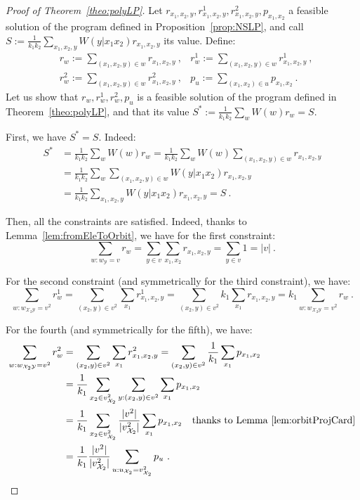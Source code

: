 \begin{proof}[Proof of Theorem~\ref{theo:polyLP}]
  Let $r_{x_1,x_2,y},r^1_{x_1,x_2,y},r^2_{x_1,x_2,y},p_{x_1,x_2}$ a feasible solution of the program defined in Proposition~\ref{prop:NSLP}, and call $S:=\frac{1}{k_1k_2} \sum_{x_1,x_2,y} W(y|x_1x_2)r_{x_1,x_2,y}$ its value. Define:
  \begin{equation}
    \begin{aligned}
      &r_w := \sum_{(x_1,x_2,y) \in w} r_{x_1,x_2,y} \ , &r^1_w := \sum_{(x_1,x_2,y) \in w} r^1_{x_1,x_2,y} \ ,\\
      &r^2_w := \sum_{(x_1,x_2,y) \in w} r^2_{x_1,x_2,y} \ , &p_u := \sum_{(x_1,x_2) \in u} p_{x_1,x_2} \ .
    \end{aligned}
  \end{equation}
  Let us show that $r_w,r^1_w,r^2_w,p_u$ is a feasible solution of the program defined in Theorem~\ref{theo:polyLP}, and that its value $S^*:=\frac{1}{k_1k_2}\sum_{w} W(w)r_w = S$.

  First, we have  $S^* = S$. Indeed:
   \begin{equation}
     \begin{aligned}
       S^*&=\frac{1}{k_1k_2}\sum_{w} W(w)r_w =\frac{1}{k_1k_2}\sum_{w} W(w) \sum_{(x_1,x_2,y) \in w} r_{x_1,x_2,y}\\
       &=\frac{1}{k_1k_2}\sum_{w} \sum_{(x_1,x_2,y) \in w} W(y|x_1x_2) r_{x_1,x_2,y}\\
       &= \frac{1}{k_1k_2}\sum_{x_1,x_2,y} W(y|x_1x_2) r_{x_1,x_2,y} = S \ .
     \end{aligned}
  \end{equation}

   Then, all the constraints are satisfied. Indeed, thanks to Lemma~\ref{lem:fromEleToOrbit}, we have for the first constraint:
   \[ \sum_{w:w_{\mathcal{Y}}=v} r_w = \sum_{y \in v} \sum_{x_1,x_2} r_{x_1,x_2,y} = \sum_{y \in v} 1 = |v| \ .\]

   For the second constraint (and symmetrically for the third constraint), we have:
   \[ \sum_{w:w_{\mathcal{X}_2\mathcal{Y}}=v^2} r^1_{w} = \sum_{(x_2,y) \in v^2} \sum_{x_1} r^1_{x_1,x_2,y} = \sum_{(x_2,y) \in v^2} k_1 \sum_{x_1} r_{x_1,x_2,y} = k_1\sum_{w:w_{\mathcal{X}_2\mathcal{Y}}=v^2} r_{w} \ .\]
   
   For the fourth (and symmetrically for the fifth), we have:
   \begin{equation}
     \begin{aligned}
       \sum_{w:w_{\mathcal{X}_2\mathcal{Y}}=v^2} r^2_w &= \sum_{(x_2,y) \in v^2} \sum_{x_1} r^2_{x_1,x_2,y} = \sum_{(x_2,y) \in v^2} \frac{1}{k_1} \sum_{x_1} p_{x_1,x_2}\\
       &= \frac{1}{k_1} \sum_{x_2 \in v^2_{\mathcal{X}_2}} \sum_{y: (x_2,y) \in v^2} \sum_{x_1} p_{x_1,x_2}\\
       &= \frac{1}{k_1} \sum_{x_2 \in v^2_{\mathcal{X}_2}} \frac{|v^2|}{|v^2_{\mathcal{X}_2}|} \sum_{x_1} p_{x_1,x_2} \quad \text{thanks to Lemma~\ref{lem:orbitProjCard}}\\
       &= \frac{1}{k_1}\frac{|v^2|}{|v^2_{\mathcal{X}_2}|} \sum_{u:u_{\mathcal{X}_2}=v^2_{\mathcal{X}_2}} p_u \ .
     \end{aligned}
   \end{equation}


\end{proof}
